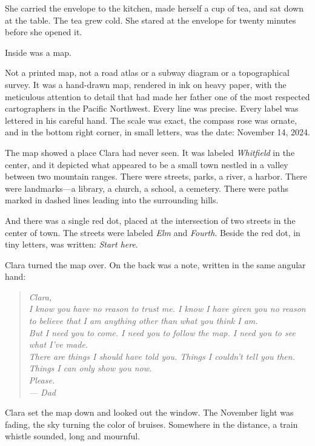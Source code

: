 \documentclass[
    language=english,
    doctype=short-story,
    institution=none,
]{../../omnilatex}
\begin{document}
She carried the envelope to the kitchen, made herself a cup of tea, and sat down at the table. The tea grew cold. She stared at the envelope for twenty minutes before she opened it.

Inside was a map.

Not a printed map, not a road atlas or a subway diagram or a topographical survey. It was a hand-drawn map, rendered in ink on heavy paper, with the meticulous attention to detail that had made her father one of the most respected cartographers in the Pacific Northwest. Every line was precise. Every label was lettered in his careful hand. The scale was exact, the compass rose was ornate, and in the bottom right corner, in small letters, was the date: November 14, 2024.

The map showed a place Clara had never seen. It was labeled \textit{Whitfield} in the center, and it depicted what appeared to be a small town nestled in a valley between two mountain ranges. There were streets, parks, a river, a harbor. There were landmarks---a library, a church, a school, a cemetery. There were paths marked in dashed lines leading into the surrounding hills.

And there was a single red dot, placed at the intersection of two streets in the center of town. The streets were labeled \textit{Elm} and \textit{Fourth}. Beside the red dot, in tiny letters, was written: \textit{Start here}.

Clara turned the map over. On the back was a note, written in the same angular hand:

\begin{quote}
\textit{Clara,}\\[0.3cm]
\textit{I know you have no reason to trust me. I know I have given you no reason to believe that I am anything other than what you think I am.}\\[0.3cm]
\textit{But I need you to come. I need you to follow the map. I need you to see what I've made.}\\[0.3cm]
\textit{There are things I should have told you. Things I couldn't tell you then. Things I can only show you now.}\\[0.3cm]
\textit{Please.}\\[0.3cm]
\textit{--- Dad}
\end{quote}

Clara set the map down and looked out the window. The November light was fading, the sky turning the color of bruises. Somewhere in the distance, a train whistle sounded, long and mournful.
\end{document}
